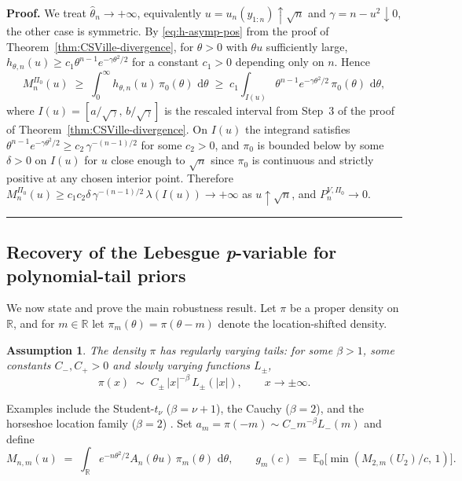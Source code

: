 \documentclass{article}%
\newtheorem{assumption}[theorem]{Assumption}
\newenvironment{proof}[1][Proof]{\noindent\textbf{#1.} }{\ \rule{0.5em}{0.5em}}
\newcommand{\E}{\mathbb{E}}
\newcommand{\dd}{\,\mathrm{d}}
\newcommand{\1}{\mathbf{1}}
\begin{document}
\begin{proof}
We treat \(\widehat\theta_n\to+\infty\), equivalently
\(u = u_n(y_{1:n})\uparrow\sqrt n\) and \(\gamma = n-u^2\downarrow 0\), the other case is symmetric. By \eqref{eq:h-asymp-pos} from the proof
of Theorem~\ref{thm:CSVille-divergence}, for \(\theta>0\) with \(\theta u\)
sufficiently large,
\(h_{\theta,n}(u)\geq c_1\theta^{n-1}e^{-\gamma\theta^2/2}\)
for a constant \(c_1>0\) depending only on \(n\). Hence
\[
  M_n^{\Pi_0}(u) \;\geq\; \int_0^\infty h_{\theta,n}(u)\,\pi_0(\theta)\,\dd\theta
  \;\geq\; c_1\int_{I(u)} \theta^{n-1}e^{-\gamma\theta^2/2}\,\pi_0(\theta)\,\dd\theta,
\]
where \(I(u) = [a/\sqrt\gamma,\,b/\sqrt\gamma]\) is the rescaled interval from Step~3 of the proof of Theorem~\ref{thm:CSVille-divergence}. On \(I(u)\) the integrand satisfies \(\theta^{n-1}e^{-\gamma\theta^2/2}\geq c_2\,\gamma^{-(n-1)/2}\)
for some \(c_2>0\), and \(\pi_0\) is bounded below by some \(\delta>0\) on \(I(u)\) for \(u\) close enough to \(\sqrt n\) since \(\pi_0\) is continuous and strictly positive at any chosen interior
point. Therefore \(M_n^{\Pi_0}(u)\geq c_1c_2\delta\,\gamma^{-(n-1)/2}\,
\lambda(I(u))\to+\infty\) as \(u\uparrow\sqrt n\), and \(P_n^{V,\Pi_0}\to 0\).
\end{proof}

\subsection{Recovery of the Lebesgue \textit{p}-variable for polynomial-tail priors}
\label{sec:recovery}

We now state and prove the main robustness result. Let \(\pi\) be a
proper density on \(\mathbb{R}\), and for \(m\in\mathbb{R}\) let
\(\pi_m(\theta)=\pi(\theta-m)\) denote the location-shifted density.

\begin{assumption}\label{ass:tails}
The density \(\pi\) has regularly varying tails: for some \(\beta>1\), some constants \(C_-,C_+>0\) and slowly varying functions \(L_\pm\),
\begin{equation}\label{eq:tails}
   \pi(x)\;\sim\; C_\pm\,|x|^{-\beta}\,L_\pm(|x|),\qquad x\to\pm\infty.
\end{equation}
\end{assumption}

Examples include the Student-\(t_\nu\) (\(\beta=\nu+1\)), the Cauchy
(\(\beta=2\)), and the horseshoe location family (\(\beta=2\))
\citep{Carvalho2010}. Set
\(a_m =\pi(-m)\sim C_-m^{-\beta}L_-(m)\) and define
\begin{equation}\label{eq:Mnm-def}
  M_{n,m}(u)\;=\;\int_\mathbb{R} e^{-n\theta^2/2}A_n(\theta u)\,\pi_m(\theta)
  \,\dd\theta,
  \qquad
  g_m(c)\;=\;\E_0\!\bigl[\min(M_{2,m}(U_2)/c,\,1)\bigr].
\end{equation}
\end{document}
